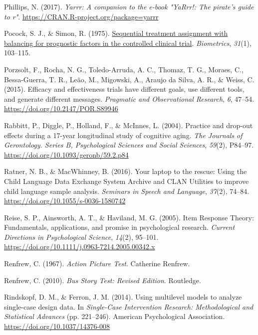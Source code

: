 \documentclass{krantz}
\newlength{\cslhangindent}
\newlength{\cslentryspacingunit} %
\newenvironment{CSLReferences}[2] %
{%
\setlength{\parindent}{0pt}
\ifodd #1
\let\oldpar\par
\def\par{\hangindent=\cslhangindent\oldpar}
\fi
\setlength{\parskip}{#2\cslentryspacingunit}
}%
{}
\begin{document}
\begin{CSLReferences}{1}{0}
\leavevmode{}%
Phillips, N. (2017). \emph{Yarrr: A companion to the e-book "YaRrr!: The pirate's guide to r"}. \url{https://CRAN.R-project.org/package=yarrr}

\leavevmode{}%
Pocock, S. J., \& Simon, R. (1975). \href{https://www.ncbi.nlm.nih.gov/pubmed/1100130}{Sequential treatment assignment with balancing for prognostic factors in the controlled clinical trial}. \emph{Biometrics}, \emph{31}(1), 103--115.

\leavevmode{}%
Porzsolt, F., Rocha, N. G., Toledo-Arruda, A. C., Thomaz, T. G., Moraes, C., Bessa-Guerra, T. R., Leão, M., Migowski, A., Araujo da Silva, A. R., \& Weiss, C. (2015). Efficacy and effectiveness trials have different goals, use different tools, and generate different messages. \emph{Pragmatic and Observational Research}, \emph{6}, 47--54. \url{https://doi.org/10.2147/POR.S89946}

\leavevmode{}%
Rabbitt, P., Diggle, P., Holland, F., \& McInnes, L. (2004). Practice and drop-out effects during a 17-year longitudinal study of cognitive aging. \emph{The Journals of Gerontology. Series B, Psychological Sciences and Social Sciences}, \emph{59}(2), P84--97. \url{https://doi.org/10.1093/geronb/59.2.p84}

\leavevmode{}%
Ratner, N. B., \& MacWhinney, B. (2016). Your laptop to the rescue: {Using} the {Child Language Data Exchange System Archive} and {CLAN Utilities} to improve child language sample analysis. \emph{Seminars in Speech and Language}, \emph{37}(2), 74--84. \url{https://doi.org/10.1055/s-0036-1580742}

\leavevmode{}%
Reise, S. P., Ainsworth, A. T., \& Haviland, M. G. (2005). Item {Response Theory}: {Fundamentals}, applications, and promise in psychological research. \emph{Current Directions in Psychological Science}, \emph{14}(2), 95--101. \url{https://doi.org/10.1111/j.0963-7214.2005.00342.x}

\leavevmode{}%
Renfrew, C. (1967). \emph{Action {Picture Test}}. {Catherine Renfrew}.

\leavevmode{}%
Renfrew, C. (2010). \emph{Bus {Story Test}: {Revised Edition}}. {Routledge}.

\leavevmode{}%
Rindskopf, D. M., \& Ferron, J. M. (2014). Using multilevel models to analyze single-case design data. In \emph{Single-{Case Intervention Research}: {Methodological} and {Statistical Advances}} (pp. 221--246). {American Psychological Association}. \url{https://doi.org/10.1037/14376-008}


\end{CSLReferences}
\end{document}
